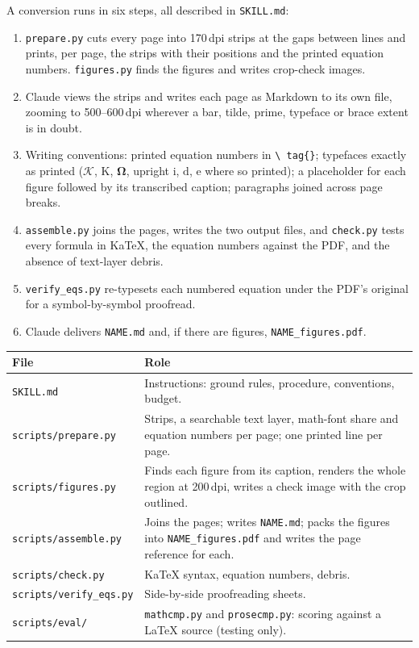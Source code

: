 \documentclass[11pt]{article}
\newcommand{\file}[1]{\texttt{#1}}
\begin{document}
A conversion runs in six steps, all described in \file{SKILL.md}:
\begin{enumerate}[label=\arabic*.]
\item \file{prepare.py} cuts every page into 170\,dpi strips at the gaps between
  lines and prints, per page, the strips with their positions and the printed
  equation numbers. \file{figures.py} finds the figures and writes crop-check
  images.
\item Claude views the strips and writes each page as Markdown to its own file,
  zooming to 500--600\,dpi wherever a bar, tilde, prime, typeface or brace
  extent is in doubt.
\item Writing conventions: printed equation numbers in \texttt{\textbackslash
  tag\{\}}; typefaces exactly as printed ($\mathcal K$, $\mathrm K$,
  $\bm\Omega$, upright $\mathrm i$, $\mathrm d$, $\mathrm e$ where so printed);
  a placeholder for each figure followed by its transcribed caption; paragraphs
  joined across page breaks.
\item \file{assemble.py} joins the pages, writes the two output files, and
  \file{check.py} tests every formula in KaTeX, the equation numbers against the
  PDF, and the absence of text-layer debris.
\item \file{verify\_eqs.py} re-typesets each numbered equation under the PDF's
  original for a symbol-by-symbol proofread.
\item Claude delivers \file{NAME.md} and, if there are figures,
  \file{NAME\_figures.pdf}.
\end{enumerate}

\begin{tabularx}{\linewidth}{@{}lL@{}}
\toprule
File & Role \\
\midrule
\file{SKILL.md} & Instructions: ground rules, procedure, conventions, budget. \\
\file{scripts/prepare.py} & Strips, a searchable text layer, math-font share and
  equation numbers per page; one printed line per page. \\
\file{scripts/figures.py} & Finds each figure from its caption, renders the whole
  region at 200\,dpi, writes a check image with the crop outlined. \\
\file{scripts/assemble.py} & Joins the pages; writes \file{NAME.md}; packs the
  figures into \file{NAME\_figures.pdf} and writes the page reference for each. \\
\file{scripts/check.py} & KaTeX syntax, equation numbers, debris. \\
\file{scripts/verify\_eqs.py} & Side-by-side proofreading sheets. \\
\file{scripts/eval/} & \file{mathcmp.py} and \file{prosecmp.py}: scoring
  against a LaTeX source (testing only). \\
\bottomrule
\end{tabularx}
\end{document}
